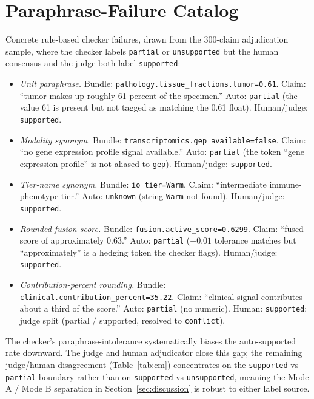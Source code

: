 \documentclass[11pt]{article}
\begin{document}
\section{Paraphrase-Failure Catalog}
\label{app:paraphrases}

Concrete rule-based checker failures, drawn from the 300-claim adjudication sample, where the checker labels \texttt{partial} or \texttt{unsupported} but the human consensus and the judge both label \texttt{supported}:

\begin{itemize}
\item \emph{Unit paraphrase.} Bundle: \texttt{pathology.tissue\_fractions.tumor=0.61}. Claim: ``tumor makes up roughly 61 percent of the specimen.'' Auto: \texttt{partial} (the value 61 is present but not tagged as matching the 0.61 float). Human/judge: \texttt{supported}.
\item \emph{Modality synonym.} Bundle: \texttt{transcriptomics.gep\_available=false}. Claim: ``no gene expression profile signal available.'' Auto: \texttt{partial} (the token ``gene expression profile'' is not aliased to \texttt{gep}). Human/judge: \texttt{supported}.
\item \emph{Tier-name synonym.} Bundle: \texttt{io\_tier=Warm}. Claim: ``intermediate immune-phenotype tier.'' Auto: \texttt{unknown} (string \texttt{Warm} not found). Human/judge: \texttt{supported}.
\item \emph{Rounded fusion score.} Bundle: \texttt{fusion.active\_score=0.6299}. Claim: ``fused score of approximately 0.63.'' Auto: \texttt{partial} ($\pm 0.01$ tolerance matches but ``approximately'' is a hedging token the checker flags). Human/judge: \texttt{supported}.
\item \emph{Contribution-percent rounding.} Bundle: \texttt{clinical.contribution\_percent=35.22}. Claim: ``clinical signal contributes about a third of the score.'' Auto: \texttt{partial} (no numeric). Human: \texttt{supported}; judge split (partial / supported, resolved to \texttt{conflict}).
\end{itemize}

The checker's paraphrase-intolerance systematically biases the auto-supported rate downward. The judge and human adjudicator close this gap; the remaining judge/human disagreement (Table~\ref{tab:cm}) concentrates on the \texttt{supported} vs \texttt{partial} boundary rather than on \texttt{supported} vs \texttt{unsupported}, meaning the Mode A / Mode B separation in Section~\ref{sec:discussion} is robust to either label source.
\end{document}
